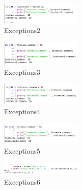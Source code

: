 \hfill\break
	\begin{figure}[H]
		\centering
		\includegraphics[width=4cm]{figures/kelompok1/1/dzihan/class2.PNG}
		\caption{Exceptions2}
	\end{figure}
\hfill\break


\hfill\break
	\begin{figure}[H]
		\centering
		\includegraphics[width=4cm]{figures/kelompok1/1/dzihan/class3.PNG}
		\caption{Exceptions3}
	\end{figure}
\hfill\break


\hfill\break
	\begin{figure}[H]
		\centering
		\includegraphics[width=4cm]{figures/kelompok1/1/dzihan/class4.PNG}
		\caption{Exceptions4}
	\end{figure}
\hfill\break


\hfill\break
	\begin{figure}[H]
		\centering
		\includegraphics[width=4cm]{figures/kelompok1/1/dzihan/class5.PNG}
		\caption{Exceptions5}
	\end{figure}
\hfill\break


\hfill\break
	\begin{figure}[H]
		\centering
		\includegraphics[width=4cm]{figures/kelompok1/1/dzihan/class6.PNG}
		\caption{Exceptions6}
	\end{figure}
\hfill\break


